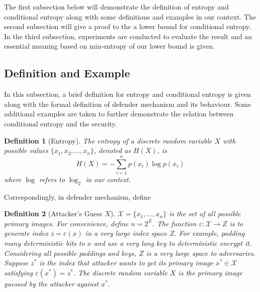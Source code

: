 \documentclass[10pt, conference, compsocconf]{IEEEtran}
\newtheorem{mydef}{Definition}
\begin{document}
    The first subsection below will demonstrate the definition
    of entropy and conditional entropy along with some
    definitions and examples in our context. The second subsection
    will give a proof to the a lower bound for conditional entropy.
    In the third subsection, experiments
    are conducted to evaluate the result and an essential meaning based on min-entropy 
    of our lower bound is given.

    \subsection{Definition and Example}
        In this subsection, a brief definition for entropy and conditional
        entropy is given along with the formal definition of defender mechanism
        and its behaviour.
        Some additional examples are taken to further
        demonstrate the relation between conditional entropy and
        the security.

        \begin{mydef}[Entropy\cite{entropy}]\label{def_entropy}
            The entropy of a discrete random variable $X$ with
            possible values $\{x_1, x_2, \ldots, x_n\}$, denoted as  $H(X)$, is
            \begin{equation}
                H(X) = -\sum_{i=1}^n p(x_i)\log p(x_i)
            \end{equation}
            where $\log$ refers to $\log_2$ in our context.
        \end{mydef}

        Correspondingly, in defender mechanism, define
        \begin{mydef}[Attacker's Guess $X$]\label{def2}
            $\mathcal{X} = \{x_1, \ldots, x_n\}$ is the set of all possible
            primary images.
            For convenience, define $n = 2^E$.
            The function $\varepsilon: \mathcal X \rightarrow Z$ is to generate index $z = \varepsilon(x)$
            in a very large index space $Z$. For example, padding many deterministic bits to $x$ and use
            a very long key to deterministic encrypt it. Considering all possible paddings
            and keys, $Z$ is a very large space to adversaries.
            Suppose $z^*$ is the index that attacker wants to
            get its primary image $x^* \in \mathcal{X}$ satisfying $\varepsilon(x^*) = z^*$.
            The discrete random variable $X$ is the
            primary image guessed by the attacker against $x^*$.
        \end{mydef}
 
\end{document}
